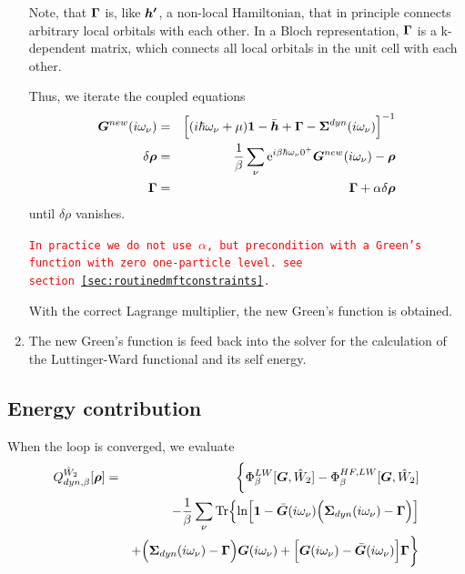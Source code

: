 \documentclass[11pt,a4paper]{report}
\newcommand{\petertt}[1]{\textcolor{red}{\texttt{#1}}}
\begin{document}
\begin{enumerate}
Note, that $\bm{\Gamma}$ is, like $\bm{h'}$, a non-local Hamiltonian,
that in principle connects arbitrary local orbitals with each
other. In a Bloch representation, $\bm{\Gamma}$ is a k-dependent matrix,
which connects all local orbitals in the unit cell with each other.

Thus, we iterate the coupled equations
\begin{eqnarray}
\bm{G}^{new}(i\omega_\nu)&=&\Bigl[(i\hbar\omega_\nu+\mu)\bm{1}
-\bar{\bm{h}}+\bm{\Gamma}
-\bm{\Sigma}^{dyn}(i\omega_\nu)
\Bigr]^{-1}
\nonumber\\
\delta\bm{\rho}&=&\frac{1}{\beta}\sum_\nu 
\mathrm{e}^{i\beta\hbar\omega_\nu0^+}\bm{G}^{new}(i\omega_\nu)-\bm{\rho}
\nonumber\\
\bm{\Gamma}&=&\bm{\Gamma}+\alpha \delta\bm{\rho}
\end{eqnarray}
until $\delta\rho$ vanishes.

\petertt{In practice we do not use $\alpha$, but precondition with a
  Green's function with zero one-particle level. see
  section~\ref{sec:routinedmftconstraints}.}

With the correct Lagrange multiplier, the new Green's function is
obtained.
%
\item The new Green's function is feed back into the solver for the
  calculation of the Luttinger-Ward functional and its self energy.
\end{enumerate}

\subsection{Energy contribution}
When the loop is converged,  we evaluate 
\begin{eqnarray}
Q^{\hat{W}_2}_{dyn,\beta}[\bm{\rho}]
&=&
\biggl\lbrace
\Phi^{LW}_\beta[\bm{G},\hat{W}_2]-\Phi^{HF,LW}_\beta[\bm{G},\hat{W}_2]
\nonumber\\
&&-\frac{1}{\beta}\sum_\nu\mathrm{Tr}\Bigl\lbrace
\ln\Bigl[
\bm{1}-
\bar{\bm{G}}(i\omega_\nu)
\Bigl(\bm{\Sigma}_{dyn}(i\omega_\nu)-\bm{\Gamma}\Bigr)
\Bigr]
\nonumber\\&&
+\Bigl(\bm{\Sigma}_{dyn}(i\omega_\nu)-\bm{\Gamma}\Bigr)\bm{G}(i\omega_\nu)
+
\Bigl[\bm{G}(i\omega_\nu)-\bar{\bm{G}}(i\omega_\nu)\Bigr]
\bm{\Gamma}
\biggr\rbrace
\nonumber\\
\label{eq:dmf1greenenergy}
\end{eqnarray}
\end{document}
